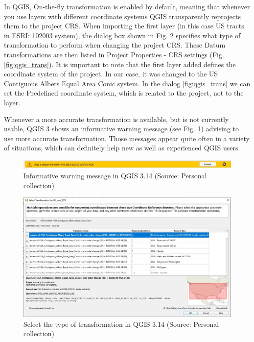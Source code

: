\documentclass[a4paper,10pt,twoside]{article}
\begin{document}
\noindent In QGIS, On-the-fly transformation is enabled by default, meaning that whenever you use layers with different coordinate systems QGIS transparently reprojects them to the project CRS. When importing the first layer (in this case US tracts in ESRI: 102003 system), the dialog box shown in Fig. \ref{fig:qgis_transformation} specifies what type of transformation to perform when changing the project CRS. These Datum transformations are then listed in Project Properties - CRS settings (Fig. \ref{fig:qgis_trans}). It is important to note that the first layer added defines the coordinate system of the project. In our case, it was changed to the US Contiguous Albers Equal Area Conic system. In the dialog \ref{fig:qgis_trans} we can set the Predefined coordinate system, which is related to the project, not to the layer.

Whenever a more accurate transformation is available, but is not currently usable, QGIS 3 shows an informative warning message (see Fig. \ref{fig:qgis_warning_window}) advising to use more accurate transformation. Those messages appear quite often in a variety of situations, which can definitely help new as well as experienced QGIS users.

\begin{figure}[hbt!] 
\begin{center}
\includegraphics[width=17cm]{../pictures/qgis_warning_window.JPG} 
\caption[Informative warning message  in QGIS 3.14]{Informative warning message  in QGIS 3.14 (Source: Personal collection)}
\label{fig:qgis_warning_window}
\end{center}
\end{figure}

\begin{figure}[hbt!] 
\begin{center}
\includegraphics[width=14cm]{../pictures/qgis_transformation.JPG} 
\caption[Select the type of transformation in QGIS 3.14]{Select the type of transformation in QGIS 3.14 (Source: Personal collection)}
\label{fig:qgis_transformation}
\end{center}
\end{figure}
\end{document}
